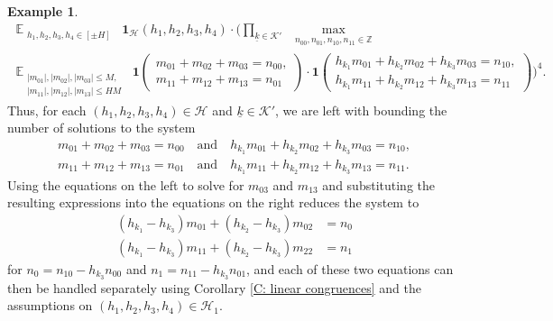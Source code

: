 \documentclass[11pt]{amsart}
\theoremstyle{definition}
\newtheorem{example}[lemma]{Example} %
\DeclareMathOperator*{\E}{\mathbb{E}}
\newcommand{\Z}{{\mathbb Z}}
\newcommand{\CH}{{\mathcal H}}
\newcommand{\CK}{{\mathcal K}}
\newcommand{\uk}{{\underline{k}}}
\begin{document}
\begin{example}
\begin{multline*}
        \E_{\substack{h_1, h_2, h_3, h_4\in[\pm H]}}\; \mathbf{1}_{\CH}(h_1, h_2, h_3, h_4)\cdot \big(\prod_{\uk\in\CK'}\; \max_{\substack{n_{00}, n_{01}, n_{10}, n_{11}\in\Z}}\\
        \E_{\substack{|m_{01}|, |m_{02}|, |m_{03}|\leq M,\\ |m_{11}|, |m_{12}|, |m_{13}|\leq H M}}\; \mathbf{1} \begin{pmatrix}
        m_{01} + m_{02} + m_{03} = n_{00},\\
        m_{11} + m_{12} + m_{13} = n_{01}
        \end{pmatrix}\cdot \mathbf{1} \begin{pmatrix}
        h_{k_1}m_{01} + h_{k_2}m_{02} + h_{k_3}m_{03} = n_{10},\\ h_{k_1}m_{11} + h_{k_2}m_{12} + h_{k_3}m_{13} = n_{11}
        \end{pmatrix}\big)^4.
    \end{multline*}
Thus, for each $(h_1, h_2, h_3, h_4)\in\CH$ and $\uk\in\CK'$, we are left with bounding the number of solutions to the system
    \begin{align*}
        m_{01} + m_{02} + m_{03} = n_{00} \quad \textrm{and}\quad h_{k_1}m_{01} + h_{k_2}m_{02} + h_{k_3}m_{03} = n_{10},\\
        m_{11} + m_{12} + m_{13} = n_{01} \quad \textrm{and}\quad h_{k_1}m_{11} + h_{k_2}m_{12} + h_{k_3}m_{13} = n_{11}.
    \end{align*}
    Using the equations on the left to solve for $m_{03}$ and $m_{13}$ and substituting the resulting expressions into the equations on the right reduces the system to
    \begin{align*}
        (h_{k_1}-h_{k_3})m_{01} + (h_{k_2}-h_{k_3})m_{02} &= n_0\\
        (h_{k_1}-h_{k_3})m_{11} + (h_{k_2}-h_{k_3})m_{22} &= n_1
    \end{align*}
    for $n_0 = n_{10} - h_{k_3} n_{00}$ and  $n_1 = n_{11} - h_{k_3} n_{01}$, and each of these two equations can then be handled separately using Corollary \ref{C: linear congruences} and the assumptions on $(h_1, h_2, h_3, h_4)\in\CH_1$. 


\end{example}
\end{document}
